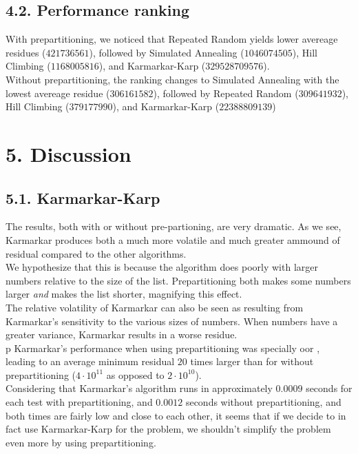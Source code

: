 \documentclass{article}
\begin{document}
\subsection*{4.2. Performance ranking}
    With prepartitioning, we noticed that Repeated Random yields lower avereage residues ($421736561$), followed by Simulated Annealing ($1046074505$), Hill Climbing ($1168005816$), and Karmarkar-Karp ($329528709576$).\\
    
    Without prepartitioning, the ranking changes to Simulated Annealing with the lowest avereage residue ($306161582$), followed by Repeated Random ($309641932$), Hill Climbing ($379177990$), and Karmarkar-Karp ($22388809139$)

\newpage
\section*{5. Discussion}
\subsection*{5.1. Karmarkar-Karp}
The results, both with or without pre-partioning, are very dramatic. As we see, Karmarkar produces both a much more volatile and much greater ammound of residual compared to the other algorithms.\\ 

We hypothesize that this is because the algorithm does poorly with larger numbers relative to the size of the list. Prepartitioning both makes some numbers larger \emph{and} makes the list shorter, magnifying this effect. \\

The relative volatility of Karmarkar can also be seen as resulting from Karmarkar's sensitivity to the various sizes of numbers. When numbers have a greater variance, Karmarkar results in a worse residue.\\
p
Karmarkar's performance when using prepartitioning was specially oor , leading to an average minimum residual $20$ times larger than for without prepartitioning ($4\cdot10^{11}$ as opposed to $2\cdot10^{10}$).\\

Considering that Karmarkar's algorithm runs in approximately $0.0009$ seconds for each test with prepartitioning, and $0.0012$ seconds without prepartitioning, and both times are fairly low and close to each other, it seems that if we decide to in fact use Karmarkar-Karp for the problem, we shouldn't simplify the problem even more by using prepartitioning.\\
\end{document}
